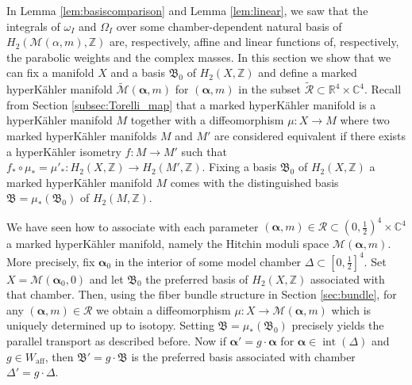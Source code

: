 \documentclass[12pt,letterpaper,reqno]{amsart}
\def\bm#1{#1}%
\def\mathbf#1{#1}%
\theoremstyle{remark}
\theoremstyle{definition}
\numberwithin{thm}{section}
\numberwithin{equation}{section}
\numberwithin{figure}{section}
\newcommand{\cM}{\ensuremath{\mathcal M}}
\newcommand{\R}{\ensuremath{\mathbb R}}
\newcommand{\C}{\ensuremath{\mathbb C}}
\newcommand{\Z}{\ensuremath{\mathbb Z}}
\newcommand{\bfalpha}{\ensuremath{\bm \alpha}}
\newcommand{\bfm}{\mathbf{m}}
\newcommand{\Simplex}{\Delta}
\DeclareMathOperator{\interior}{int}
\begin{document}
In Lemma  \ref{lem:basiscomparison} and Lemma \ref{lem:linear}, we saw that the integrals of $\omega_I$ and $\Omega_I$ over some chamber-dependent natural basis of $H_2(\cM(\bfalpha,\bfm), \Z)$ are, respectively, affine and linear functions of, respectively, the parabolic weights and the complex masses. In this section we show that we can fix a manifold $X$ and a basis $\mathfrak{B}_0$ of $H_2(X,\Z)$ and define a marked hyperK\"ahler manifold $\widetilde{\cM}(\boldsymbol{\alpha}, \mathbf{m})$ for $(\boldsymbol{\alpha}, \mathbf{m})$ in the subset $\widetilde{\mathcal{R}} \subset \R^4 \times \C^4$. Recall from Section \ref{subsec:Torelli_map} that
a marked hyperK\"ahler manifold is a hyperK\"ahler manifold $M$ together with a diffeomorphism $\mu : X \to M$ where two marked hyperK\"ahler manifolds $M$ and $M'$ are considered equivalent if there exists a hyperK\"ahler isometry $f: M \to M'$ such that $f_* \circ \mu_* = \mu'_* : H_2(X,\Z) \to H_2(M',\Z)$. 
Fixing a basis $\mathfrak{B}_0$ of $H_2(X,\Z)$ a marked hyperK\"ahler manifold $M$ comes with the distinguished basis $\mathfrak{B}=\mu_*(\mathfrak{B}_0)$ of $H_2(M,\Z)$.  

\medskip

We have seen how to associate with each parameter $(\boldsymbol{\alpha}, \mathbf{m}) \in \mathcal{R} \subset (0,\frac 12 )^4 \times \C^4$ a marked hyperK\"ahler manifold, namely the Hitchin moduli space $\cM(\boldsymbol{\alpha}, \mathbf{m})$.
More precisely, fix $\boldsymbol{\alpha}_0$ in the interior of some model chamber $\Simplex \subset [0,\frac 12 ]^4$. Set $X=\cM(\boldsymbol{\alpha}_0, \mathbf{0})$ and let $\mathfrak{B}_0$ the preferred basis of $H_2(X,\Z)$ associated with that chamber. Then, using the fiber bundle structure in Section \ref{sec:bundle}, for any $(\boldsymbol{\alpha}, \mathbf{m}) \in \mathcal{R}$ we obtain a diffeomorphism $\mu: X \to \cM(\boldsymbol{\alpha}, \mathbf{m})$ which is uniquely determined up to isotopy. Setting $\mathfrak{B} = \mu_*(\mathfrak{B}_0)$ precisely yields the parallel transport as described before. Now if $\boldsymbol{\alpha}' = g \cdot \boldsymbol{\alpha}$ for $\boldsymbol{\alpha} \in \interior(\Simplex)$ and $g \in W_{\mathrm{aff}}$, then $\mathfrak{B}' = g \cdot \mathfrak{B}$ is the preferred basis associated with chamber $\Simplex' = g \cdot \Simplex$.

\medskip
\end{document}
